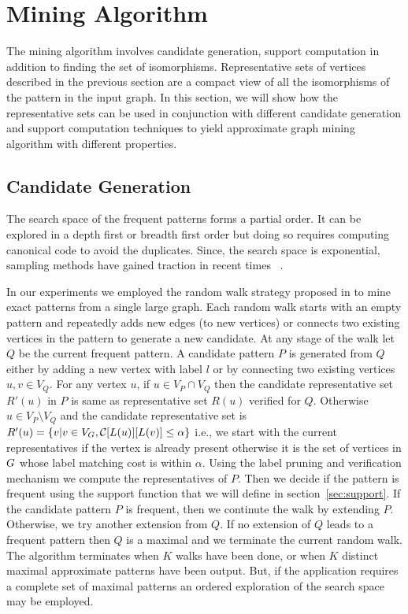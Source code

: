 \section{Mining Algorithm}
\label{sec:mining}
 The mining algorithm involves candidate generation, support computation in
 addition to finding the set of isomorphisms.  Representative sets of vertices
 described in the previous section are a compact view of all the isomorphisms of
 the pattern in the input graph. In this section, we will show how the
 representative sets can be used in conjunction with different candidate
 generation and support computation techniques to yield approximate graph mining
 algorithm with different properties.


\subsection{Candidate Generation} 

The search space of the frequent patterns forms a partial order.  It can be
explored in a depth first or breadth first order but doing so requires computing
canonical code to avoid the duplicates. Since, the search space is exponential,
sampling methods have gained traction in recent
times~\cite{2008-origami:sadm,2009-graphsampling} . 


In our experiments we employed the random walk strategy proposed in
\cite{2012-kais} to mine exact patterns from a single large graph. Each random
walk starts with an empty pattern and repeatedly adds new edges (to new
vertices) or connects two existing vertices in the pattern to generate a new
candidate. At any stage of the walk let $Q$ be the current frequent pattern.  A
candidate pattern $P$ is generated from $Q$ either by adding a new vertex with
label $l$ or by connecting two existing vertices $u, v \in V_Q$.  For any vertex
$u$, if $u \in V_P \cap V_Q$ then the candidate representative set $R'(u)$ in
$P$ is same as representative set $R(u)$ verified for $Q$. Otherwise $u \in V_P
\setminus V_Q$ and the candidate representative set is $R'(u) = \{ v | v \in
V_G, \mathcal{C}[L(u)][L(v)] \leq \alpha \} $ i.e., we start with the current
representatives if the vertex is already present otherwise it is the set of
vertices in $G$ whose label matching cost is within $\alpha$. Using the label
pruning and verification mechanism we compute the representatives of $P$.  Then
we decide if the pattern is frequent using the support function that we will
define in section~\ref{sec:support}. If the candidate pattern $P$ is frequent,
then we continute the walk by extending $P$. Otherwise, we  try another
extension from $Q$. If no extension of $Q$ leads to a frequent pattern then $Q$
is a maximal and we terminate the current random walk.  The algorithm terminates
when $K$ walks have been done, or when $K$ distinct maximal approximate patterns
have been output. But, if the application requires a complete set of maximal
patterns an ordered exploration of the search space may be employed.




